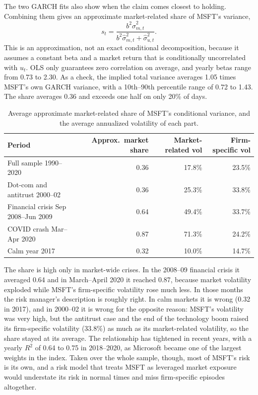 \documentclass[11pt]{article}
\newcommand{\1}{\mathbf{1}}
\begin{document}
The two GARCH fits also show when the claim comes closest to holding. Combining them gives
an approximate market-related share of MSFT's variance,
\[
s_t=\frac{b^2\hat\sigma^2_{m,t}}{b^2\hat\sigma^2_{m,t}+\hat\sigma^2_{u,t}} .
\]
This is an approximation, not an exact conditional decomposition, because it assumes a
constant beta and a market return that is conditionally uncorrelated with $u_t$. OLS only
guarantees zero correlation on average, and yearly betas range from 0.73 to 2.30. As a check,
the implied total variance averages 1.05 times MSFT's own GARCH variance, with a 10th--90th
percentile range of 0.72 to 1.43. The share averages 0.36 and exceeds one half on only 20\% of
days.

\begin{table}[!htb]
\centering
\small
\begin{tabular}{lrrr}
\toprule
Period & Approx.\ market share & Market-related vol & Firm-specific vol \\
\midrule
Full sample 1990--2020 & 0.36 & 17.8\% & 23.5\% \\
Dot-com and antitrust 2000--02 & 0.36 & 25.3\% & 33.8\% \\
Financial crisis Sep 2008--Jun 2009 & 0.64 & 49.4\% & 33.7\% \\
COVID crash Mar--Apr 2020 & 0.87 & 71.3\% & 24.2\% \\
Calm year 2017 & 0.32 & 10.0\% & 14.7\% \\
\bottomrule
\end{tabular}
\caption{Average approximate market-related share of MSFT's conditional variance, and the
average annualized volatility of each part.}
\end{table}

The share is high only in market-wide crises. In the 2008--09 financial crisis it averaged
0.64 and in March--April 2020 it reached 0.87, because market volatility exploded while
MSFT's firm-specific volatility rose much less. In those months the risk manager's
description is roughly right. In calm markets it is wrong (0.32 in 2017), and in 2000--02 it
is wrong for the opposite reason: MSFT's volatility was very high, but the antitrust case and
the end of the technology boom raised its firm-specific volatility (33.8\%) as much as its
market-related volatility, so the share stayed at its average. The relationship has tightened
in recent years, with a yearly $R^2$ of 0.64 to 0.75 in 2018--2020, as Microsoft became one of
the largest weights in the index. Taken over the whole sample, though, most of MSFT's risk is
its own, and a risk model that treats MSFT as leveraged market exposure would understate its
risk in normal times and miss firm-specific episodes altogether.
\end{document}
